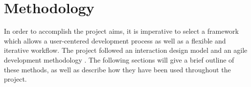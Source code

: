 \chapter{Methodology}
In order to accomplish the project aims, it is imperative to select a framework which allows a user-centered development process as well as a flexible and iterative workflow. The project followed an interaction design model \cite{Sharp2011} and an agile development methodology \cite{Martin2002}. The following sections will give a brief outline of these methods, as well as describe how they have been used throughout the project.



\iffalse\fi
